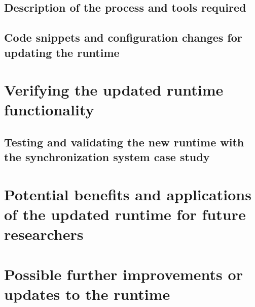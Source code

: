 \subsection{Description of the process and tools required}

\subsection{Code snippets and configuration changes for updating the runtime}

\section{Verifying the updated runtime functionality}

\subsection{Testing and validating the new runtime with the synchronization system case study}

\section{Potential benefits and applications of the updated runtime for future researchers}

\section{Possible further improvements or updates to the runtime}
